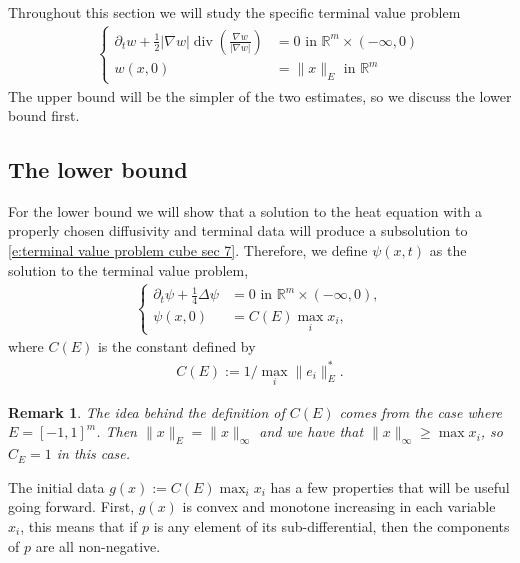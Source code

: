 \documentclass[reqno]{amsart}
\newtheorem{remark}[theorem]{Remark}
\numberwithin{equation}{section}
\DeclareMathOperator{\dive}{div}
\begin{document}
Throughout this section we will study the specific terminal value problem
  \begin{align}\label{e:terminal value problem cube sec 7}
    \left \{ \begin{array}{rl}\partial_t w + \tfrac{1}{2}|\nabla w|\dive\left ( \frac{\nabla w}{|\nabla w|}\right ) & = 0 \text{ in } \mathbb{R}^m\times (-\infty,0)\\ 
    w(x,0) & = \|x\|_E \text{ in } \mathbb{R}^m \end{array}\right. 
  \end{align}
  The upper bound will be the simpler of the two estimates, so we discuss the lower bound first.
  


\subsection{The lower bound} For the lower bound we will show that a solution to the heat equation with a properly chosen diffusivity and terminal data will produce a subsolution to \eqref{e:terminal value problem cube sec 7}. Therefore, we define $\psi(x,t)$ as the solution to the terminal value problem,
\begin{align}\label{e:heat equation factor 1/4}
  \left \{ \begin{array}{rl}
 \partial_t \psi + \tfrac{1}{4} \Delta \psi  & =0  \text{ in } \mathbb{R}^m\times (-\infty,0),\\
  \psi(x,0)  & = C(E) \max_i x_i,  \end{array}\right.
\end{align}
where $C(E)$ is the constant defined by
\begin{align*}
C(E) := 1/\max_i \| e_i\|^*_E.
\end{align*}

\begin{remark} The idea behind the definition of $C(E)$ comes from the case where $E=[-1,1]^m$. Then $\|x\|_E = \|x\|_\infty$ and we have that $\|x\|_\infty \geq \max x_i$, so $C_E = 1$ in this case.     
\end{remark}

The initial data $g(x) := C(E) \max_i x_i$ has a few properties that will be useful going forward. First, $g(x)$ is convex and monotone increasing in each variable $x_i$, this means that if $p$ is any element of its sub-differential, then the components of $p$ are all non-negative.  
\end{document}
